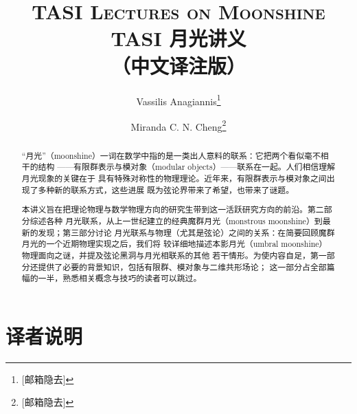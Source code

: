 \documentclass[11pt,a4paper,fontset=windows]{ctexart}
\begin{document}
\title{%
  \vspace{-35pt}
  \textsc{\huge TASI Lectures on Moonshine}\\[8pt]
  \Large TASI 月光讲义\\[2pt]
  \large（中文译注版）}
\author[1]{Vassilis Anagiannis\thanks{[邮箱隐去]}}
\author[1,2]{Miranda C. N. Cheng\thanks{[邮箱隐去]}}
\date{}
\maketitle

\begin{abstract}
\normalsize
“月光”（moonshine）一词在数学中指的是一类出人意料的联系：它把两个看似毫不相干的结构
——有限群表示与模对象（modular objects）——联系在一起。人们相信理解月光现象的关键在于
具有特殊对称性的物理理论。近年来，有限群表示与模对象之间出现了多种新的联系方式，这些进展
既为弦论界带来了希望，也带来了谜题。

本讲义旨在把理论物理与数学物理方向的研究生带到这一活跃研究方向的前沿。第二部分综述各种
月光联系，从上一世纪建立的经典魔群月光（monstrous moonshine）到最新的发现；第三部分讨论
月光联系与物理（尤其是弦论）之间的关系：在简要回顾魔群月光的一个近期物理实现之后，我们将
较详细地描述本影月光（umbral moonshine）物理面向之谜，并提及弦论黑洞与月光相联系的其他
若干情形。为使内容自足，第一部分还提供了必要的背景知识，包括有限群、模对象与二维共形场论；
这一部分占全部篇幅的一半，熟悉相关概念与技巧的读者可以跳过。
\end{abstract}

\newpage

\section*{译者说明}
\end{document}
